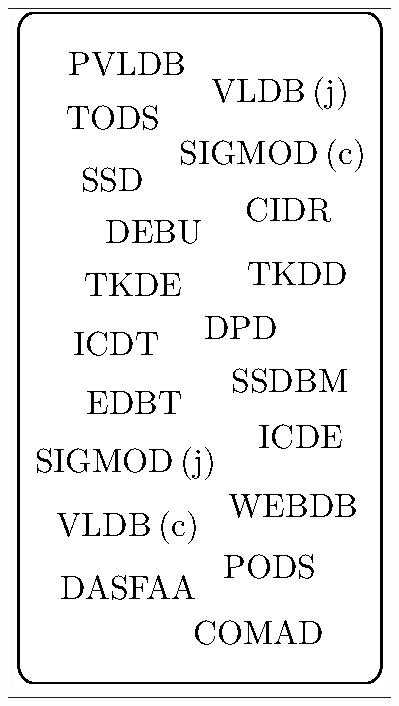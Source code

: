 \documentclass[msc]{ppgccufmg}
\begin{document}
\begin{table}[htbp]
\begin{tabular}{c}
\multirow{20}{*}{\includegraphics{fig/db-norm-venues-blob.eps}} \\ %
\\
\\
\\
\\
\\
\\
\\
\\
\\
\\
\\
\\
\\
\\
\\
\\
\\
\\
\\
\bottomrule
\end{tabular} \ \

\end{table}
\end{document}
